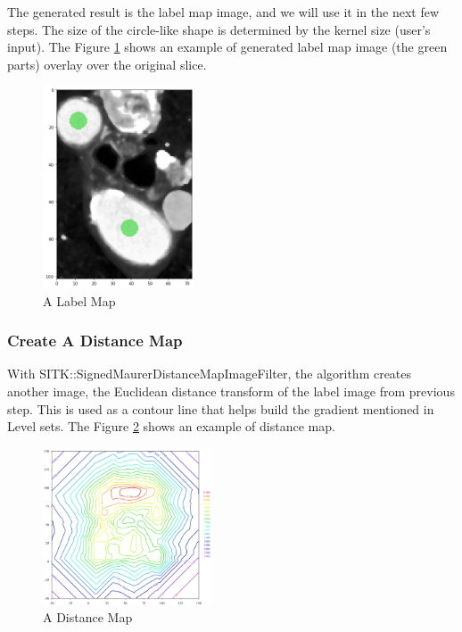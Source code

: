 The generated result is the label map image, and we will use it in the next few steps. The size of the circle-like shape is determined by the kernel size (user's input). The Figure \ref{fig_label_map} shows an example of generated label map image (the green parts) overlay over the original slice.

\begin{figure}[H]
    \centering
    \includegraphics[width=0.4\textwidth]{figures/AGR/label_image.png}
    \caption[A label image]{A Label Map}
    \label{fig_label_map}
\end{figure}

\subsubsection{Create A Distance Map}\label{distance_map}
With SITK::SignedMaurerDistanceMapImageFilter, the algorithm creates another image, the Euclidean distance transform of the label image from previous step. This is used as a contour line that helps build the gradient mentioned in Level sets. The Figure \ref{fig_distance_map} shows an example of distance map.

\begin{figure}[H]
    \centering
    \includegraphics[width=0.45\textwidth]{figures/AGR/Contour2D.png}
    \caption[A Distance Map]{A Distance Map}
    \label{fig_distance_map}
\end{figure}

